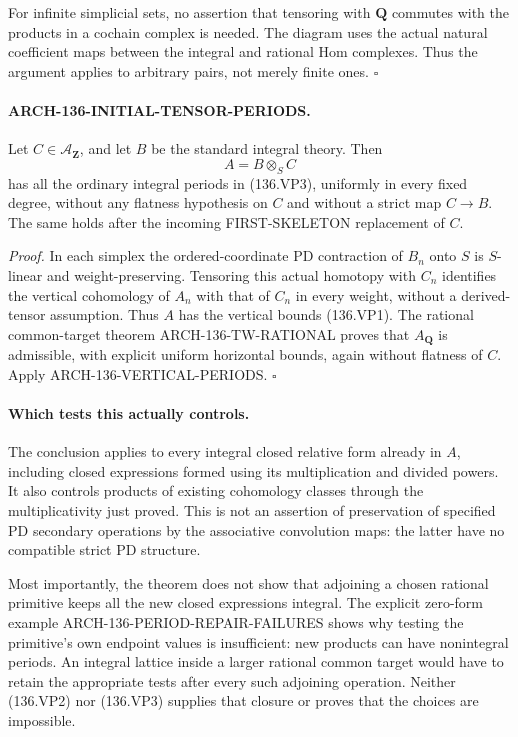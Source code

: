 For infinite simplicial sets, no assertion that tensoring
with \(\mathbf Q\) commutes with the products in a cochain
complex is needed. The diagram uses the actual natural
coefficient maps between the integral and rational Hom
complexes. Thus the argument applies to arbitrary pairs,
not merely finite ones.
\hfill\(\square\)

\paragraph{ARCH-136-INITIAL-TENSOR-PERIODS.}
Let \(C\in\mathcal A_{\mathbf Z}\), and let \(B\) be the
standard integral theory. Then
\[
                            A=B\otimes_S C
 \]
has all the ordinary integral periods in (136.VP3),
uniformly in every fixed degree, without any flatness
hypothesis on \(C\) and without a strict map \(C\to B\).
The same holds after the incoming FIRST-SKELETON replacement
of \(C\).

\emph{Proof.}
In each simplex the ordered-coordinate PD contraction of
\(B_n\) onto \(S\) is \(S\)-linear and weight-preserving.
Tensoring this actual homotopy with \(C_n\) identifies
the vertical cohomology of \(A_n\) with that of \(C_n\)
in every weight, without a derived-tensor assumption.
Thus \(A\) has the vertical bounds (136.VP1).
The rational common-target theorem ARCH-136-TW-RATIONAL
proves that \(A_{\mathbf Q}\) is admissible, with explicit
uniform horizontal bounds, again without flatness of \(C\).
Apply ARCH-136-VERTICAL-PERIODS.
\hfill\(\square\)

\paragraph{Which tests this actually controls.}
The conclusion applies to every integral closed relative form
already in \(A\), including closed expressions formed using
its multiplication and divided powers. It also controls
products of existing cohomology classes through the
multiplicativity just proved. This is not an assertion of
preservation of specified PD secondary operations by the
associative convolution maps: the latter have no compatible
strict PD structure.

Most importantly, the theorem does not show that adjoining
a chosen rational primitive keeps all the new closed
expressions integral. The explicit zero-form example
ARCH-136-PERIOD-REPAIR-FAILURES shows why testing the
primitive's own endpoint values is insufficient: new
products can have nonintegral periods. An integral lattice
inside a larger rational common target would have to
retain the appropriate tests after every such adjoining
operation. Neither (136.VP2) nor (136.VP3) supplies that
closure or proves that the choices are impossible.

